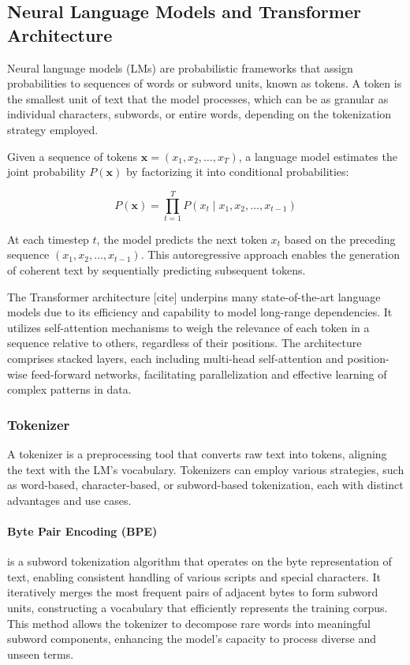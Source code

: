 \documentclass{article}
\newcounter{para}
\begin{document}
\subsection{Neural Language Models and Transformer Architecture} \label{sec:pre-lm}

Neural language models (LMs) are probabilistic frameworks that assign probabilities to sequences of words or subword units, known as tokens. A token is the smallest unit of text that the model processes, which can be as granular as individual characters, subwords, or entire words, depending on the tokenization strategy employed.

Given a sequence of tokens \( \mathbf{x} = (x_1, x_2, \ldots, x_T) \), a language model estimates the joint probability \( P(\mathbf{x}) \) by factorizing it into conditional probabilities:

\[
P(\mathbf{x}) = \prod_{t=1}^T P(x_t \mid x_1, x_2, \ldots, x_{t-1})
\]

At each timestep \( t \), the model predicts the next token \( x_t \) based on the preceding sequence \( (x_1, x_2, \ldots, x_{t-1}) \). This autoregressive approach enables the generation of coherent text by sequentially predicting subsequent tokens.

The Transformer architecture [cite] underpins many state-of-the-art language models due to its efficiency and capability to model long-range dependencies. It utilizes self-attention mechanisms to weigh the relevance of each token in a sequence relative to others, regardless of their positions. The architecture comprises stacked layers, each including multi-head self-attention and position-wise feed-forward networks, facilitating parallelization and effective learning of complex patterns in data.

\subsubsection{Tokenizer} \label{sec:pre-tokenizer}

A tokenizer is a preprocessing tool that converts raw text into tokens, aligning the text with the LM's vocabulary. Tokenizers can employ various strategies, such as word-based, character-based, or subword-based tokenization, each with distinct advantages and use cases.

\paragraph{Byte Pair Encoding (BPE)} is a subword tokenization algorithm that operates on the byte representation of text, enabling consistent handling of various scripts and special characters. It iteratively merges the most frequent pairs of adjacent bytes to form subword units, constructing a vocabulary that efficiently represents the training corpus. This method allows the tokenizer to decompose rare words into meaningful subword components, enhancing the model's capacity to process diverse and unseen terms.
\end{document}

